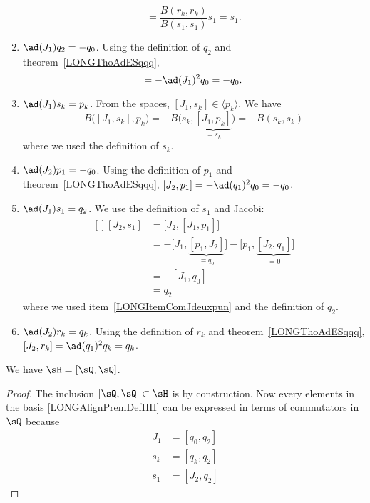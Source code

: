\begin{enumerate}
	      \begin{equation}
		      [r_k,s_k]=\frac{ B(r_k,r_k) }{ B(s_1,s_1) }s_1=s_1.
	      \end{equation}
	\item$\ad(J_1)q_2=-q_0$. Using the definition of $q_2$ and theorem~\ref{LONGThoAdESqqq},
	      \begin{equation}
		      [J_1,q_2]=-\ad(J_1)^2q_0=-q_0.
	      \end{equation}
	\item$\ad(J_1)s_k=p_k$. From the spaces, $[J_1,s_k]\in\langle p_k\rangle$. We have
	      \begin{equation}
		      B\big( [J_1,s_k],p_k \big)=-B\big( s_k,\underbrace{[J_1,p_k]}_{=s_k} \big)=-B(s_k,s_k)
	      \end{equation}
	      where we used the definition of $s_k$.
	\item$\ad(J_2)p_1=-q_0$\label{LONGItemComJdeuxpun}. Using the definition of $p_1$ and theorem~\ref{LONGThoAdESqqq}, $[J_2,p_1]=-\ad(q_1)^2q_0=-q_0$.
	\item$\ad(J_1)s_1=q_2$. We use the definition of $s_1$ and Jacobi:
	      \begin{equation}
		      \begin{aligned}[]
			      [J_2,s_1] & =\big[ J_2,[J_1,p_1] \big]                                                                  \\
			                & =-\big[ J_1,\underbrace{[p_1,J_2]}_{=q_0} \big]-\big[ p_1,\underbrace{[J_2,q_1]}_{=0} \big] \\
			                & =-[J_1,q_0]                                                                                 \\
			                & =q_2
		      \end{aligned}
	      \end{equation}
	      where we used item~\ref{LONGItemComJdeuxpun} and the definition of $q_2$.
	\item$\ad(J_2)r_k=q_k$. Using the definition of $r_k$ and theorem~\ref{LONGThoAdESqqq}, $[J_2,r_k]=\ad(q_1)^2q_k=q_k$.
\end{enumerate}

\begin{proposition}
	We have $\sH=[\sQ,\sQ]$.
\end{proposition}

\begin{proof}
	The inclusion $[\sQ,\sQ]\subset\sH$ is by construction. Now every elements in the basis \eqref{LONGAlignPremDefHH} can be expressed in terms of commutators in $\sQ$ because
	\begin{subequations}
		\begin{align}
			J_1 & =[q_0,q_2]                      \\
			s_k & =[q_k,q_2]                      \\
			s_1 & =[J_2,q_2]	\label{LONGEqJdqdsu}
		\end{align}
	\end{subequations}
\end{proof}

